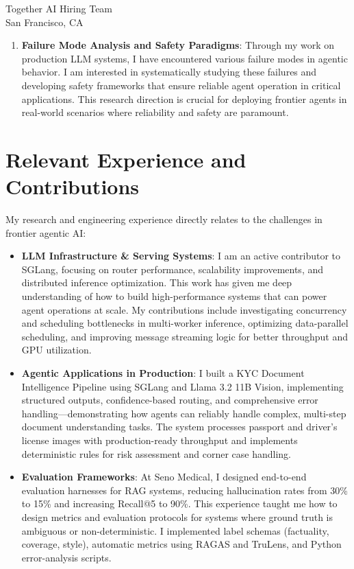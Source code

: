 \documentclass[11pt,a4paper]{letter}
\begin{document}
\begin{letter}{Together AI Hiring Team \\ San Francisco, CA}
\begin{enumerate}
\item \textbf{Failure Mode Analysis and Safety Paradigms}: Through my work on production LLM systems, I have encountered various failure modes in agentic behavior. I am interested in systematically studying these failures and developing safety frameworks that ensure reliable agent operation in critical applications. This research direction is crucial for deploying frontier agents in real-world scenarios where reliability and safety are paramount.
\end{enumerate}

\section*{Relevant Experience and Contributions}

My research and engineering experience directly relates to the challenges in frontier agentic AI:

\begin{itemize}
\item \textbf{LLM Infrastructure \& Serving Systems}: I am an active contributor to SGLang, focusing on router performance, scalability improvements, and distributed inference optimization. This work has given me deep understanding of how to build high-performance systems that can power agent operations at scale. My contributions include investigating concurrency and scheduling bottlenecks in multi-worker inference, optimizing data-parallel scheduling, and improving message streaming logic for better throughput and GPU utilization.

\item \textbf{Agentic Applications in Production}: I built a KYC Document Intelligence Pipeline using SGLang and Llama 3.2 11B Vision, implementing structured outputs, confidence-based routing, and comprehensive error handling—demonstrating how agents can reliably handle complex, multi-step document understanding tasks. The system processes passport and driver's license images with production-ready throughput and implements deterministic rules for risk assessment and corner case handling.

\item \textbf{Evaluation Frameworks}: At Seno Medical, I designed end-to-end evaluation harnesses for RAG systems, reducing hallucination rates from 30\% to 15\% and increasing Recall@5 to 90\%. This experience taught me how to design metrics and evaluation protocols for systems where ground truth is ambiguous or non-deterministic. I implemented label schemas (factuality, coverage, style), automatic metrics using RAGAS and TruLens, and Python error-analysis scripts.


\end{itemize}
\end{letter}
\end{document}
